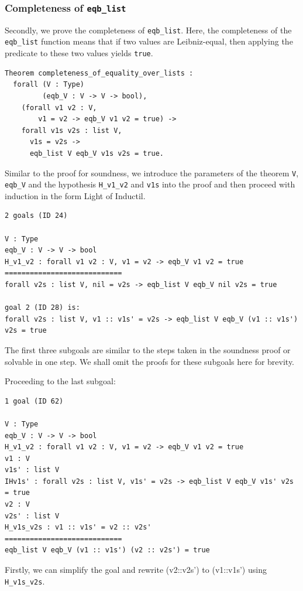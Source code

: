 \documentclass{article}
\begin{document}
\subsubsection{Completeness of \texttt{eqb\_list}}
Secondly, we prove the completeness of \texttt{eqb\_list}. Here, the completeness of the \texttt{eqb\_list} function means that if two values are Leibniz-equal, then applying the predicate to these two values yields \texttt{true}.

\begin{lstlisting}
Theorem completeness_of_equality_over_lists :
  forall (V : Type)
         (eqb_V : V -> V -> bool),
    (forall v1 v2 : V,
        v1 = v2 -> eqb_V v1 v2 = true) ->
    forall v1s v2s : list V,
      v1s = v2s ->
      eqb_list V eqb_V v1s v2s = true.
\end{lstlisting}

Similar to the proof for soundness, we introduce the parameters of the theorem \texttt{V}, \texttt{eqb\_V} and the hypothesis \texttt{H\_v1\_v2} and \texttt{v1s} into the proof and then proceed with induction in the form Light of Inductil.

\begin{lstlisting}
2 goals (ID 24)

V : Type
eqb_V : V -> V -> bool
H_v1_v2 : forall v1 v2 : V, v1 = v2 -> eqb_V v1 v2 = true
============================
forall v2s : list V, nil = v2s -> eqb_list V eqb_V nil v2s = true

goal 2 (ID 28) is:
forall v2s : list V, v1 :: v1s' = v2s -> eqb_list V eqb_V (v1 :: v1s') v2s = true
\end{lstlisting}

The first three subgoals are similar to the steps taken in the soundness proof or solvable in one step. We shall omit the proofs for these subgoals here for brevity.

Proceeding to the last subgoal:

\begin{lstlisting}
1 goal (ID 62)

V : Type
eqb_V : V -> V -> bool
H_v1_v2 : forall v1 v2 : V, v1 = v2 -> eqb_V v1 v2 = true
v1 : V
v1s' : list V
IHv1s' : forall v2s : list V, v1s' = v2s -> eqb_list V eqb_V v1s' v2s = true
v2 : V
v2s' : list V
H_v1s_v2s : v1 :: v1s' = v2 :: v2s'
============================
eqb_list V eqb_V (v1 :: v1s') (v2 :: v2s') = true  
\end{lstlisting}

Firstly, we can simplify the goal and rewrite (v2::v2s') to (v1::v1s') using \texttt{H\_v1s\_v2s}.
\end{document}

